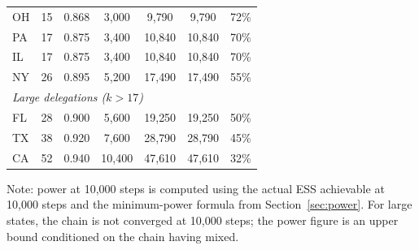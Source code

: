\begin{longtable}{llccccc}
OH & 15 & 0.868 &  3{,}000 &  9{,}790 &  9{,}790 & 72\% \\
PA & 17 & 0.875 &  3{,}400 & 10{,}840 & 10{,}840 & 70\% \\
IL & 17 & 0.875 &  3{,}400 & 10{,}840 & 10{,}840 & 70\% \\
NY & 26 & 0.895 &  5{,}200 & 17{,}490 & 17{,}490 & 55\% \\
\midrule
\multicolumn{7}{l}{\textit{Large delegations ($k > 17$)}} \\
FL & 28 & 0.900 &  5{,}600 & 19{,}250 & 19{,}250 & 50\% \\
TX & 38 & 0.920 &  7{,}600 & 28{,}790 & 28{,}790 & 45\% \\
CA & 52 & 0.940 & 10{,}400 & 47{,}610 & 47{,}610 & 32\% \\
\bottomrule
\end{longtable}

Note: power at 10,000 steps is computed using the actual ESS achievable
at 10,000 steps and the minimum-power formula from Section~\ref{sec:power}.
For large states, the chain is not converged at 10,000 steps; the power
figure is an upper bound conditioned on the chain having mixed.
